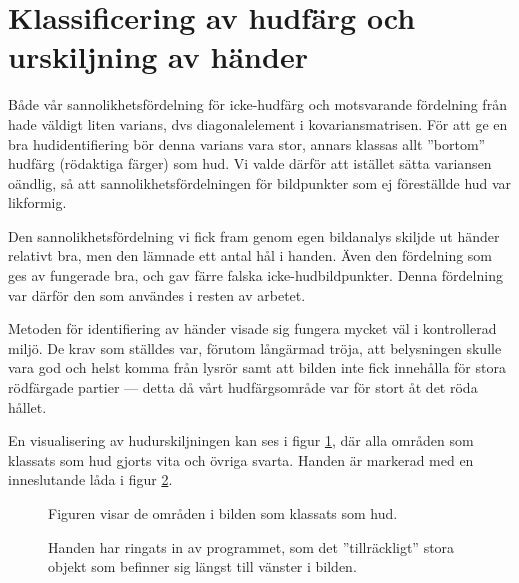 \documentclass[../rapport_MVEX01-11-05]{subfiles}
\begin{document}
\section{Klassificering av hudfärg och urskiljning av händer}
Både vår sannolikhetsfördelning för icke-hudfärg och motsvarande
fördelning från  hade väldigt liten varians,
dvs diagonalelement i kovariansmatrisen. För att ge en bra
hudidentifiering bör denna varians vara stor, annars klassas allt
''bortom'' hudfärg (rödaktiga färger) som hud. Vi valde därför att
istället sätta variansen oändlig, så att sannolikhetsfördelningen för
bildpunkter som ej föreställde hud var likformig.

Den sannolikhetsfördelning vi fick fram genom egen bildanalys skiljde
ut händer relativt bra, men den lämnade ett antal hål i handen. Även
den fördelning som ges av  fungerade bra, och
gav färre falska icke-hudbildpunkter. Denna fördelning var därför den som
användes i resten av arbetet. 

Metoden för identifiering av händer visade sig fungera mycket väl i
kontrollerad miljö. De krav som ställdes var, förutom långärmad
tröja, att belysningen skulle vara god och helst komma från lysrör
samt att bilden inte fick innehålla för stora rödfärgade partier --- detta
då vårt hudfärgsområde var för stort åt det röda hållet. 

En visualisering av hudurskiljningen kan ses i figur
\ref{fig:hudklassificering}, där alla områden som klassats som hud
gjorts vita och övriga svarta. Handen är markerad med en inneslutande
låda i figur \ref{fig:boundingbox}.

\begin{figure}
	  \centering
		\caption{Figuren visar de områden i bilden som
                  klassats som hud.}
									\label{fig:hudklassificering}
\end{figure}

\begin{figure}
	  \centering
		\caption{Handen har ringats in av programmet, som det
                  ''tillräckligt'' stora objekt som befinner sig
                  längst till vänster i bilden.}
									\label{fig:boundingbox}
\end{figure}
\end{document}
